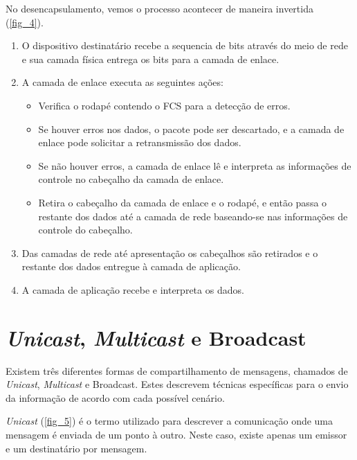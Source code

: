 \documentclass[
12pt,				%
openright,			%
oneside,			%
a4paper,			%
brazil,				%
]{abntex2}
\begin{document}
	\par No desencapsulamento, vemos o processo acontecer de maneira invertida (\autoref{fig_4}).

	\begin{enumerate}
		\item O dispositivo destinatário recebe a sequencia de bits através do meio de rede e sua camada física entrega os bits para a camada de enlace.
		\item A camada de enlace executa as seguintes ações:
		\begin{itemize}
			\item Verifica o rodapé contendo o FCS para a detecção de erros.
			\item Se houver erros nos dados, o pacote pode ser descartado, e a camada de enlace pode solicitar a retransmissão dos dados.
			\item Se não houver erros,  a camada de enlace lê e interpreta as informações de controle no cabeçalho da camada de enlace.
			\item Retira o cabeçalho da camada de enlace e o rodapé, e então passa o restante dos dados até a camada de rede baseando-se nas informações de controle do cabeçalho.
		\end{itemize} 
		\item Das camadas de rede até apresentação os cabeçalhos são retirados e o restante dos dados entregue à camada de aplicação.
		\item A camada de aplicação recebe e interpreta os dados.		
	\end{enumerate}	
	
	\section{\textit{Unicast}, \textit{Multicast} e Broadcast}
	
	\par Existem três diferentes formas de compartilhamento de mensagens, chamados de \textit{Unicast}, \textit{Multicast} e Broadcast. Estes descrevem técnicas específicas para o envio da informação de acordo com cada possível cenário.
	
	\par \textit{Unicast} (\autoref{fig_5}) é o termo utilizado para descrever a comunicação onde uma mensagem é enviada de um ponto à outro. Neste caso, existe apenas um emissor e um destinatário por mensagem.
	
\end{document}
